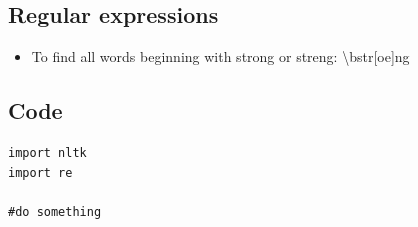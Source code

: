 \documentclass[12pt]{article}
\begin{document}
\subsection{Regular expressions}
\begin{itemize}
\item To find all words beginning with strong or streng: \textbackslash{b}str[oe]ng \end{itemize}
\subsection{Code}
\begin{lstlisting}
import nltk
import re

#do something
\end{lstlisting}

\end{document}
